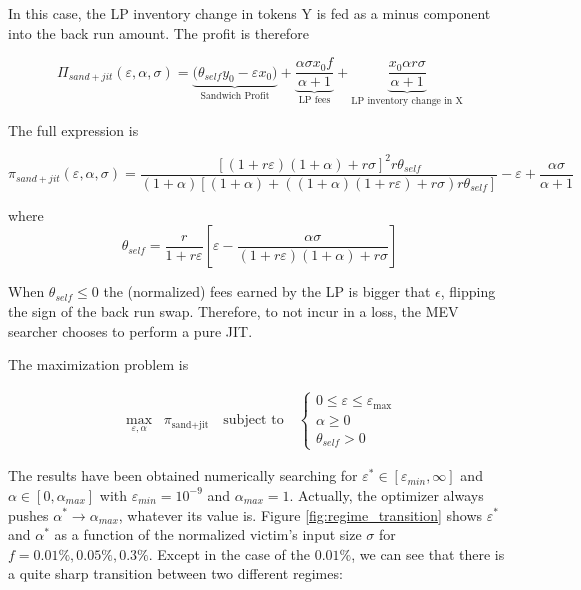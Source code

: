 \documentclass[a4paper,11pt]{article}
\begin{document}
In this case, the LP inventory change in tokens Y is fed as a minus component into the back run amount. The profit is therefore 

\begin{equation}
    \Pi_{sand+jit}(\varepsilon, \alpha, \sigma) = \underbrace{\bigl(\theta_{self}y_0 - \varepsilon x_0 \bigr)}_{\text{Sandwich Profit}} + \underbrace{\frac{\alpha\sigma x_0f}{\alpha + 1}}_{\text{LP fees}} + \underbrace{ \frac{x_0\alpha r \sigma}{\alpha+1}}_{\text{LP inventory change in X}}
\end{equation}

The full expression is

\begin{equation}
\pi_{sand+jit}(\varepsilon, \alpha, \sigma) = \frac{[(1 + r\varepsilon)(1 + \alpha) + r\sigma ]^2r\theta_{self}}{(1 + \alpha)\left[(1 + \alpha) + ((1 + \alpha)(1 + r\varepsilon) + r\sigma) r\theta_{self}\right]} - \varepsilon + \frac{\alpha\sigma}{\alpha + 1}
\end{equation}

where
\begin{equation}
    \theta_{self} = \frac{r}{1+r\varepsilon} \left[\varepsilon - \frac{\alpha \sigma}{(1+r\varepsilon)(1+\alpha)+r\sigma}\right]
\end{equation}

When $\theta_{self}\leq0$ the (normalized) fees earned by the LP is bigger that $\epsilon$, flipping the sign of the back run swap. Therefore, to not incur in a loss, the MEV searcher chooses to perform a pure JIT.

The maximization problem is 

\begin{equation}
\begin{aligned}
\max_{\varepsilon,\alpha} \;\; \pi_{\text{sand+jit}} \quad \text{subject to} \quad
\begin{cases}
0 \leq \varepsilon \leq \varepsilon_{\max} \\
\alpha \geq 0 \\
\theta_{self} >0
\end{cases}
\end{aligned}
\end{equation}

The results have been obtained numerically searching for $\varepsilon^* \in [\varepsilon_{min}, \infty]$ and $\alpha \in [0, \alpha_{max}]$ with $\varepsilon_{min}=10^{-9}$ and $\alpha_{max} = 1$. Actually, the optimizer always pushes $\alpha^* \to \alpha_{max}$, whatever its value is. Figure \ref{fig:regime_transition} shows  $\varepsilon^*$ and $\alpha^*$ as a function of the normalized victim's input size $\sigma$ for $f=0.01\%, 0.05\%, 0.3\%$. Except in the case of the $0.01\%$, we can see that there is a quite sharp transition between two different regimes:
\end{document}
